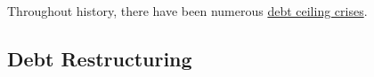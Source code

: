 \documentclass{article}
\begin{document}
      Throughout history, there have been numerous \href{https://en.wikipedia.org/wiki/History_of_the_United_States_debt_ceiling#Number_of_requests_for_increase}{debt ceiling crises}. 

      \begin{example}
        
      \end{example}

      \begin{example}
        
      \end{example}

      \begin{example}
        
      \end{example}

      \begin{example}
        
      \end{example}

  \subsection{Debt Restructuring}
\end{document}
